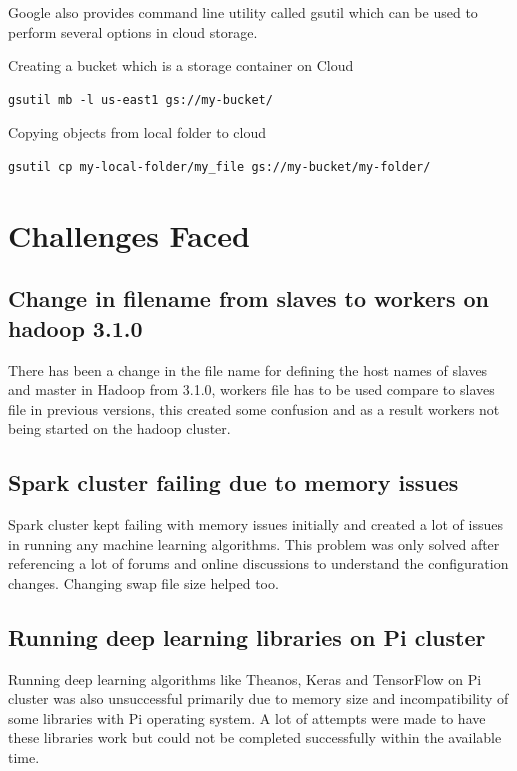Google also provides command line utility called gsutil which can be
used to perform several options in cloud storage.

Creating a bucket which is a storage container on Cloud

\begin{verbatim}
gsutil mb -l us-east1 gs://my-bucket/
\end{verbatim}

Copying objects from local folder to cloud

\begin{verbatim}
gsutil cp my-local-folder/my_file gs://my-bucket/my-folder/
\end{verbatim}

\section{Challenges Faced}


\subsection{Change in filename from slaves to workers on hadoop 3.1.0}

There has been a change in the file name for defining the host names
of slaves and master in Hadoop from 3.1.0, workers file has to be used
compare to slaves file in previous versions, this created some
confusion and as a result workers not being started on the hadoop
cluster.

\subsection{Spark cluster failing due to memory issues}

Spark cluster kept failing with memory issues initially and created a
lot of issues in running any machine learning algorithms. This problem
was only solved after referencing a lot of forums and online
discussions to understand the configuration changes. Changing swap
file size helped too.

\subsection{Running deep learning libraries on Pi cluster}

Running deep learning algorithms like Theanos, Keras and TensorFlow on
Pi cluster was also unsuccessful primarily due to memory size and
incompatibility of some libraries with Pi operating system. A lot of
attempts were made to have these libraries work but could not be
completed successfully within the available time.

